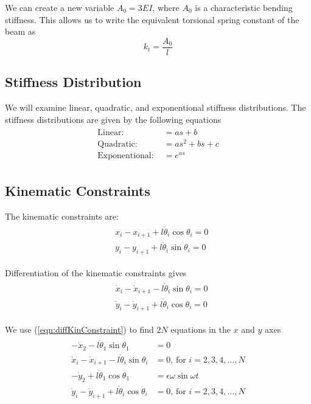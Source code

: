 \documentclass[12pt,letterpaper,titlepage]{article}
\begin{document}
We can create a new variable $A_0 = 3EI$, where $A_0$ is a characteristic bending stiffness. This allows us to write the equivalent torsional spring constant of the beam as
\begin{equation}
k_t = \frac{A_0}{l}
\end{equation}

\subsection{Stiffness Distribution}
We will examine linear, quadratic, and exponentional stiffness distributions. The stiffness distributions are given by the following equations
\begin{align}
\begin{split}
\text{Linear: } &= as + b \\
\text{Quadratic: } &= as^2 + bs + c \\
\text{Exponentional: } &= e^{as}
\end{split}
\end{align}

\subsection{Kinematic Constraints}
The kinematic constraints are:
\begin{align}
\begin{split}
& {x}_i - {x}_{i+1} + l \dot{\theta}_i \cos \theta_i = 0 \\
& {y}_i - {y}_{i+1} + l \dot{\theta}_i \sin \theta_i = 0
\end{split}
\end{align}

Differentiation of the kinematic constraints gives
\begin{align} \label{eqn:diffKinConstraint}
\begin{split}
& \dot{x}_i - \dot{x}_{i+1} - l \dot{\theta}_i \sin \theta_i = 0 \\
& \dot{y}_i - \dot{y}_{i+1} + l \dot{\theta}_i \cos \theta_i = 0
\end{split}
\end{align}

We use (\ref{eqn:diffKinConstraint}) to find $2N$ equations in the $x$ and $y$ axes
\begin{align}
\begin{split}
- \dot{x}_{2} - l \dot{\theta}_1 \sin \theta_1 &= 0\\
\dot{x}_{i} - \dot{x}_{i+1} - l \dot{\theta}_i \sin \theta_i &= 0 \text{, for } i = 2,3,4,...,N \\
- \dot{y}_{2} + l \dot{\theta}_1 \cos \theta_1 &= \epsilon \omega \sin \omega t \\
\dot{y}_{i} - \dot{y}_{i+1} + l \dot{\theta}_i \cos \theta_i &= 0 \text{, for } i = 2,3,4,...,N
\end{split}
\end{align}
\end{document}
